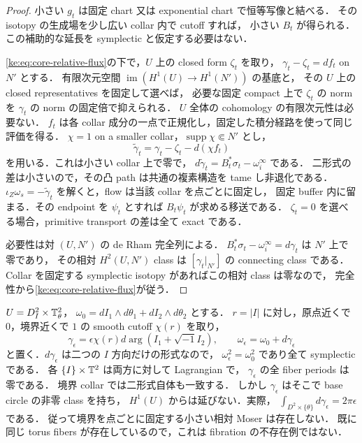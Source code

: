 \begin{proof}
小さい $g_t$ は固定 chart 又は exponential chart で恒等写像と結べる．
その isotopy の生成場を少し広い collar 内で cutoff すれば，
小さい $B_t$ が得られる．この補助的な延長を symplectic と仮定する必要はない．

\eqref{ke:eq:core-relative-flux}の下で，$U$ 上の closed form $\zeta_t$ を取り，
$\gamma_t-\zeta_t=df_t$ on $N'$ とする．
有限次元空間 $\operatorname{im}(H^1(U)\to H^1(N'))$ の基底と，
その $U$ 上の closed representatives を固定して選べば，
必要な固定 compact 上で $\zeta_t$ の norm を $\gamma_t$ の norm の固定倍で抑えられる．
$U$ 全体の cohomology の有限次元性は必要ない．
$f_t$ は各 collar 成分の一点で正規化し，固定した積分経路を使って同じ評価を得る．
$\chi=1$ on a smaller collar，$\operatorname{supp}\chi\Subset N'$ とし，
\[
 \widetilde\gamma_t=\gamma_t-\zeta_t-d(\chi f_t)
\]
を用いる．これは小さい collar 上で零で，
$d\widetilde\gamma_t=B_t^*\sigma_t-\omega_i^\infty$ である．
二形式の差は小さいので，その凸 path は共通の複素構造を tame し非退化である．
$\iota_Z\omega_s=-\widetilde\gamma_t$ を解くと，flow は当該 collar を点ごとに固定し，
固定 buffer 内に留まる．その endpoint を $\psi_t$ とすれば $B_t\psi_t$ が求める移送である．
$\zeta_t=0$ を選べる場合，primitive transport の差は全て exact である．

必要性は対 $(U,N')$ の de Rham 完全列による．
$B_t^*\sigma_t-\omega_i^\infty=d\gamma_t$ は $N'$ 上で零であり，
その相対 $H^2(U,N')$ class は $[\gamma_t|_{N'}]$ の connecting class である．
Collar を固定する symplectic isotopy があればこの相対 class は零なので，
完全性から\eqref{ke:eq:core-relative-flux}が従う．
\end{proof}

\begin{example}
\label{ke:core-relative-flux-example}
$U=D^2_I\times\mathbb T^2_\theta$，
$\omega_0=dI_1\wedge d\theta_1+dI_2\wedge d\theta_2$ とする．
$r=|I|$ に対し，原点近くで $0$，境界近くで $1$ の smooth cutoff $\chi(r)$ を取り，
\[
 \gamma_\epsilon=\epsilon\chi(r)d\arg(I_1+\sqrt{-1}I_2),
 \qquad \omega_\epsilon=\omega_0+d\gamma_\epsilon
\]
と置く．$d\gamma_\epsilon$ は二つの $I$ 方向だけの形式なので，
$\omega_\epsilon^2=\omega_0^2$ であり全て symplectic である．
各 $\{I\}\times\mathbb T^2$ は両方に対して Lagrangian で，
$\gamma_\epsilon$ の全 fiber periods は零である．
境界 collar では二形式自体も一致する．
しかし $\gamma_\epsilon$ はそこで base circle の非零 class を持ち，
$H^1(U)$ からは延びない．実際，
$\int_{D^2\times\{\theta\}}d\gamma_\epsilon=2\pi\epsilon$ である．
従って境界を点ごとに固定する小さい相対 Moser は存在しない．
既に同じ torus fibers が存在しているので，これは fibration の不存在例ではない．
\end{example}


